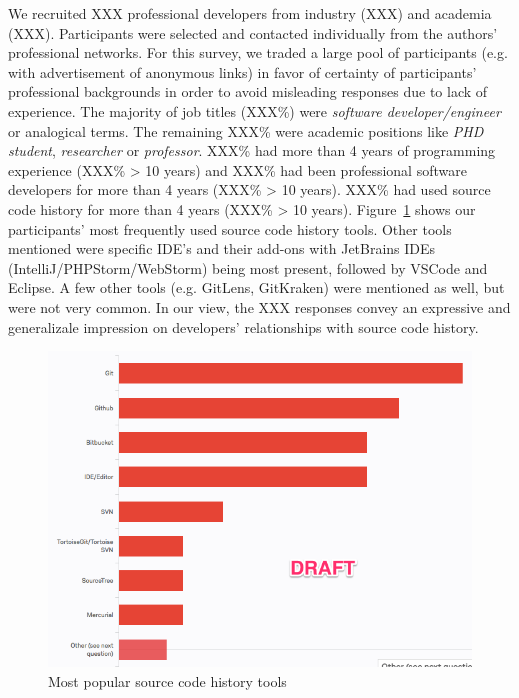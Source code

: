 We recruited XXX professional developers from industry (XXX) and academia (XXX). Participants were selected and contacted individually from the authors' professional networks. For this survey, we traded a large pool of participants (e.g. with advertisement of anonymous links) in favor of certainty of participants' professional backgrounds in order to avoid misleading responses due to lack of experience. The majority of job titles (XXX\%) were \textit{software developer/engineer} or analogical terms. The remaining XXX\% were academic positions like \textit{PHD student}, \textit{researcher} or \textit{professor}. XXX\% had more than 4 years of programming experience (XXX\% > 10 years) and XXX\% had been professional software developers for more than 4 years (XXX\% > 10 years). XXX\% had used source code history for more than 4 years (XXX\% > 10 years). Figure~\ref{fig:popular_tools} shows our participants' most frequently used source code history tools. Other tools mentioned were specific IDE's and their add-ons with JetBrains IDEs (IntelliJ/PHPStorm/WebStorm) being most present, followed by VSCode and Eclipse. A few other tools (e.g. GitLens, GitKraken) were mentioned as well, but were not very common. In our view, the XXX responses convey an expressive and generalizale impression on developers' relationships with source code history.

\begin{figure}[t!]
  \includegraphics[width=0.98\columnwidth]{figures/popular_tools}
  \caption{Most popular source code history tools}
  \label{fig:popular_tools}
\end{figure}

